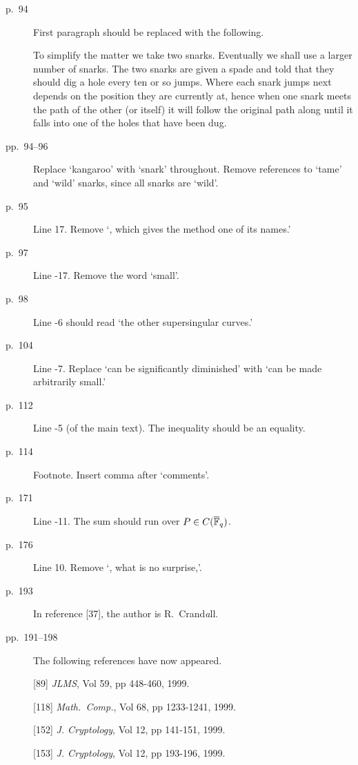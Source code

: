 \begin{description}
\item[p.\ 94] First paragraph should be replaced with the following.

To simplify the matter we take two snarks. Eventually we shall use 
a larger number of snarks.  The two snarks are given a spade and told that they
should dig a hole every ten or so jumps.  Where each snark jumps next
depends on the position they are currently at, hence when one snark
meets the path of the other (or itself) it will follow the original
path along until it falls into one of the holes that have been dug.


\item[pp.\ 94--96]
Replace `kangaroo' with `snark' throughout.  Remove references to `tame' and
`wild' snarks, since all snarks are `wild'.

\item[p.\ 95]
Line 17.  Remove `, which gives the method one of its names.'

\item[p.\ 97] 
Line -17. Remove the word `small'.

\item[p.\ 98] Line -6 should read `the other supersingular curves.'

\item[p.\ 104] Line -7. 
Replace `can be significantly diminished' with `can be made
arbitrarily small.'

\item[p.\ 112] Line -5 (of the main text). 
The inequality should be an equality.

\item[p.\ 114] Footnote. Insert comma after `comments'.

\item[p.\ 171] Line -11. The sum should run over $P \in C({\overline{{\Bbb F}}}_q)$.

\item[p.\ 176] Line 10. Remove `, what is no surprise,'.

\item[p.\ 193] In reference [37], the author is R.\ Crand{\em a}ll.


\item[pp.\ 191--198] The following references have now appeared.

[89]  {\em JLMS}, Vol 59, pp 448-460, 1999.

[118] {\em Math.\ Comp.}, Vol 68, pp 1233-1241, 1999.

[152] {\em J. Cryptology}, Vol 12, pp 141-151, 1999.

[153] {\em J. Cryptology}, Vol 12, pp 193-196, 1999. 

\end{description}

